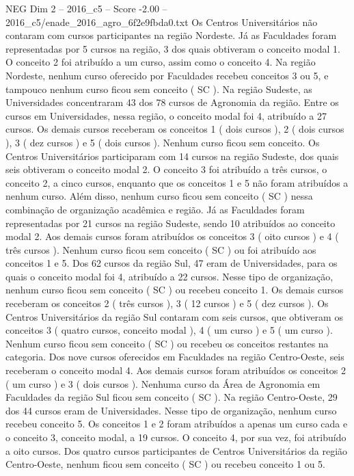 \begin{textsample}{NEG Dim 2 – 2016\_c5 – Score -2.00 – 2016\_c5/enade\_2016\_agro\_6f2e9fbda0.txt}
Os Centros Universitários não contaram com cursos participantes na região Nordeste.
Já as Faculdades foram representadas por 5 cursos na região, 3 dos quais obtiveram o conceito modal 1.
O conceito 2 foi atribuído a um curso, assim como o conceito 4.
Na região Nordeste, nenhum curso oferecido por Faculdades recebeu conceitos 3 ou 5, e tampouco nenhum curso ficou sem conceito ( SC ).
Na região Sudeste, as Universidades concentraram 43 dos 78 cursos de Agronomia da região.
Entre os cursos em Universidades, nessa região, o conceito modal foi 4, atribuído a 27 cursos.
Os demais cursos receberam os conceitos 1 ( dois cursos ), 2 ( dois cursos ), 3 ( dez cursos ) e 5 ( dois cursos ).
Nenhum curso ficou sem conceito.
Os Centros Universitários participaram com 14 cursos na região Sudeste, dos quais seis obtiveram o conceito modal 2.
O conceito 3 foi atribuído a três cursos, o conceito 2, a cinco cursos, enquanto que os conceitos 1 e 5 não foram atribuídos a nenhum curso.
Além disso, nenhum curso ficou sem conceito ( SC ) nessa combinação de organização acadêmica e região.
Já as Faculdades foram representadas por 21 cursos na região Sudeste, sendo 10 atribuídos ao conceito modal 2.
Aos demais cursos foram atribuídos os conceitos 3 ( oito cursos ) e 4 ( três cursos ).
Nenhum curso ficou sem conceito ( SC ) ou foi atribuído aos conceitos 1 e 5.
Dos 62 cursos da região Sul, 47 eram de Universidades, para os quais o conceito modal foi 4, atribuído a 22 cursos.
Nesse tipo de organização, nenhum curso ficou sem conceito ( SC ) ou recebeu conceito 1.
Os demais cursos receberam os conceitos 2 ( três cursos ), 3 ( 12 cursos ) e 5 ( dez cursos ).
Os Centros Universitários da região Sul contaram com seis cursos, que obtiveram os conceitos 3 ( quatro cursos, conceito modal ), 4 ( um curso ) e 5 ( um curso ).
Nenhum curso ficou sem conceito ( SC ) ou recebeu os conceitos restantes na categoria.
Dos nove cursos oferecidos em Faculdades na região Centro-Oeste, seis receberam o conceito modal 4.
Aos demais cursos foram atribuídos os conceitos 2 ( um curso ) e 3 ( dois cursos ).
Nenhuma curso da Área de Agronomia em Faculdades da região Sul ficou sem conceito ( SC ).
Na região Centro-Oeste, 29 dos 44 cursos eram de Universidades.
Nesse tipo de organização, nenhum curso recebeu conceito 5.
Os conceitos 1 e 2 foram atribuídos a apenas um curso cada e o conceito 3, conceito modal, a 19 cursos.
O conceito 4, por sua vez, foi atribuído a oito cursos.
Dos quatro cursos participantes de Centros Universitários da região Centro-Oeste, nenhum ficou sem conceito ( SC ) ou recebeu conceito 1 ou 5.

\end{textsample}
